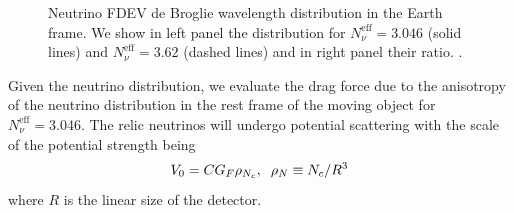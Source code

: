 \begin{figure} 
\begin{minipage}{\textwidth}
\end{minipage}
\caption{Neutrino  FDEV de Broglie wavelength  distribution in the Earth frame. We show in left panel the distribution for $N_\nu^{\mathrm{eff}}=3.046$ (solid lines) and $N_\nu^{\mathrm{eff}}=3.62$ (dashed lines) and in right panel their ratio. .  }\label{fig:deBrogle300}
 \end{figure}

Given the neutrino distribution, we evaluate the drag force due to the anisotropy of the neutrino distribution in the rest frame of the moving object for $N_\nu^{\mathrm{eff}}=3.046$. The relic neutrinos will undergo potential scattering with the scale of the potential strength being
\begin{equation}\label{V0}
V_0=CG_F\rho_{N_c},\hspace{2mm} \rho_N\equiv N_c/R^3
\end{equation}
where $R$ is the linear size of the detector.  

